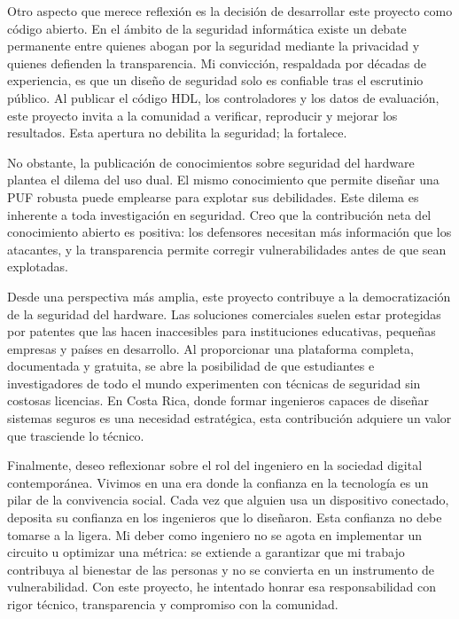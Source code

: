Otro aspecto que merece reflexión es la decisión de desarrollar este proyecto
como código abierto. En el ámbito de la seguridad informática existe un debate
permanente entre quienes abogan por la seguridad mediante la privacidad y quienes
defienden la transparencia. Mi convicción, respaldada por décadas de experiencia,
es que un diseño de seguridad solo es confiable tras el escrutinio público. Al
publicar el código HDL, los controladores y los datos de evaluación, este proyecto
invita a la comunidad a verificar, reproducir y mejorar los resultados. Esta
apertura no debilita la seguridad; la fortalece.

No obstante, la publicación de conocimientos sobre seguridad del hardware plantea
el dilema del uso dual. El mismo conocimiento que permite diseñar una PUF robusta
puede emplearse para explotar sus debilidades. Este dilema es inherente a toda
investigación en seguridad. Creo que la contribución neta del conocimiento abierto
es positiva: los defensores necesitan más información que los atacantes, y la
transparencia permite corregir vulnerabilidades antes de que sean explotadas.

Desde una perspectiva más amplia, este proyecto contribuye a la democratización
de la seguridad del hardware. Las soluciones comerciales suelen estar protegidas
por patentes que las hacen inaccesibles para instituciones educativas, pequeñas
empresas y países en desarrollo. Al proporcionar una plataforma completa,
documentada y gratuita, se abre la posibilidad de que estudiantes e investigadores
de todo el mundo experimenten con técnicas de seguridad sin costosas licencias.
En Costa Rica, donde formar ingenieros capaces de diseñar sistemas seguros es una
necesidad estratégica, esta contribución adquiere un valor que trasciende lo
técnico.

Finalmente, deseo reflexionar sobre el rol del ingeniero en la sociedad digital
contemporánea. Vivimos en una era donde la confianza en la tecnología es un pilar
de la convivencia social. Cada vez que alguien usa un dispositivo conectado,
deposita su confianza en los ingenieros que lo diseñaron. Esta confianza no debe
tomarse a la ligera. Mi deber como ingeniero no se agota en implementar un
circuito u optimizar una métrica: se extiende a garantizar que mi trabajo
contribuya al bienestar de las personas y no se convierta en un instrumento de
vulnerabilidad. Con este proyecto, he intentado honrar esa responsabilidad con
rigor técnico, transparencia y compromiso con la comunidad.